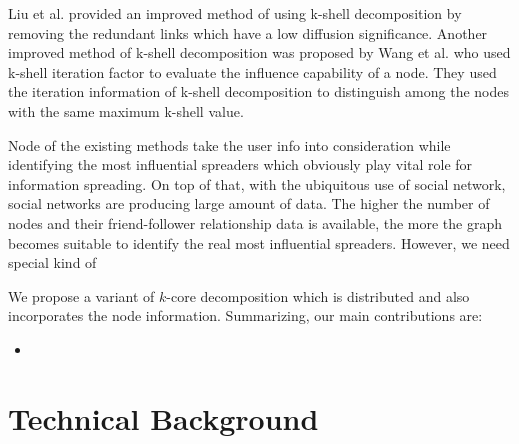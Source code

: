 \documentclass[sigconf]{acmart}
\begin{document}
Liu et al. \cite{liu2015improving} provided an improved method of using k-shell decomposition by removing the redundant links which have a low diffusion significance. Another improved method of k-shell decomposition was proposed by Wang et al.\cite{wang2016fast} who used k-shell iteration factor to evaluate the influence capability of a node. They used the iteration information of k-shell decomposition to distinguish among the nodes with the same maximum k-shell value.

Node of the existing methods take the user info into consideration while identifying the most influential spreaders which obviously play vital role for information spreading. On top of that, with the ubiquitous use of social network, social networks are producing large amount of data. The higher the number of nodes and their friend-follower relationship data is available, the more the graph becomes suitable to identify the real most influential spreaders. However, we need special kind of 


We propose a variant of $k$-core decomposition which is distributed and also incorporates the node information. Summarizing, our main contributions are:

\begin{itemize}
	\item  
\end{itemize} 

\section{Technical Background}
\end{document}
